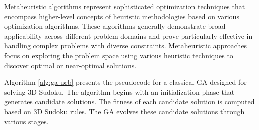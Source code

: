 \documentclass{article}
\begin{document}
Metaheuristic algorithms represent sophisticated optimization techniques that encompass higher-level concepts of heuristic methodologies based on various optimization algorithms. These algorithms generally demonstrate broad applicability across different problem domains and prove particularly effective in handling complex problems with diverse constraints. Metaheuristic approaches focus on exploring the problem space using various heuristic techniques to discover optimal or near-optimal solutions.

Algorithm \ref{alg:ga-ucb} presents the pseudocode for a classical GA designed for solving 3D Sudoku. The algorithm begins with an initialization phase that generates candidate solutions. The fitness of each candidate solution is computed based on 3D Sudoku rules. The GA evolves these candidate solutions through various stages.
\end{document}
